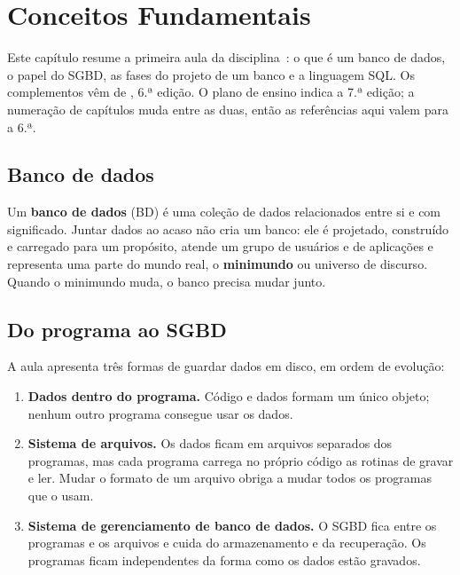 \setchapterpreamble[u]{\margintoc}
\chapter{Conceitos Fundamentais}

Este capítulo resume a primeira aula da disciplina~\cite{BaiocoCET615}:
o que é um banco de dados, o papel do SGBD, as fases do projeto de um
banco e a linguagem SQL. Os complementos vêm de \textcite{Elmasri2011},
6.ª edição. O plano de ensino indica a 7.ª edição; a numeração de
capítulos muda entre as duas, então as referências aqui valem para a 6.ª.

\section{Banco de dados}

Um \textbf{banco de dados} (BD) é uma coleção de dados
relacionados entre si e com significado. Juntar dados ao acaso não cria um
banco: ele é projetado, construído e carregado para um propósito, atende
um grupo de usuários e de aplicações e representa uma parte do mundo real,
o \textbf{minimundo} ou universo de discurso. Quando o
minimundo muda, o banco precisa mudar junto.

\section{Do programa ao SGBD}

A aula apresenta três formas de guardar dados em disco, em ordem de
evolução:

\begin{enumerate}
	\item \textbf{Dados dentro do programa.} Código e dados formam um único
	objeto; nenhum outro programa consegue usar os dados.
	\item \textbf{Sistema de arquivos.} Os dados ficam em arquivos separados
	dos programas, mas cada programa carrega no próprio código as rotinas de
	gravar e ler. Mudar o formato de um arquivo obriga a mudar todos os
	programas que o usam.
	\item \textbf{Sistema de gerenciamento de banco de dados.} O SGBD fica
	entre os programas e os arquivos e cuida do armazenamento e da
	recuperação. Os programas ficam independentes da forma como os dados
	estão gravados.
\end{enumerate}

